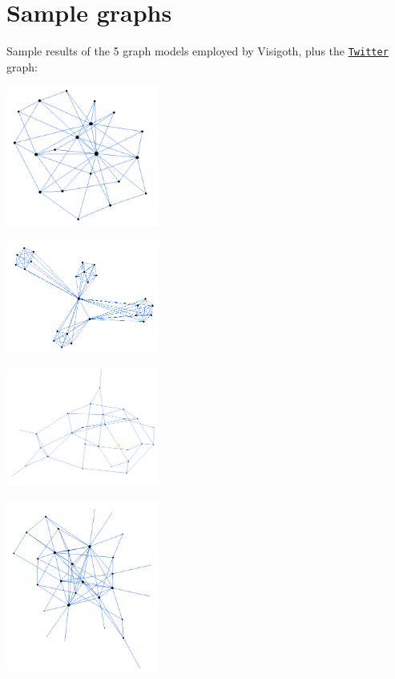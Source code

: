 \documentclass[a4paper,11pt,titlepage]{article}
\let\stdhref\href
\renewcommand{\href}[2]{\stdhref{#1}{\texttt{#2}}}
\let\stdsection\section         %
\renewcommand{\section}{\newpage\stdsection}
\newcommand{\Twitter}{\href{http://twitter.com}{Twitter} }
\begin{document}
\section{Sample graphs}

Sample results of the 5 graph models employed by Visigoth, plus the
\Twitter graph:

\begin{center}
  \noindent\begin{minipage}{.45\textwidth}
    \centering
    \includegraphics[width=5cm]{barabasi.png}
  \end{minipage}
  \begin{minipage}{.45\textwidth}
    \centering
    \includegraphics[width=5cm]{bipartite.png}
  \end{minipage}
  \medskip

  \noindent\begin{minipage}{.45\textwidth}
    \centering
    \includegraphics[width=5cm]{erdos.png}
  \end{minipage}
  \begin{minipage}{.45\textwidth}
    \centering
    \includegraphics[width=5cm]{preferential.png}
  \end{minipage}
  \medskip


\end{center}
\end{document}
